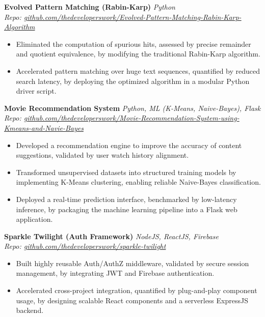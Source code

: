 \documentclass[10pt, letterpaper]{article}
\begin{document}
\noindent \textbf{Evolved Pattern Matching (Rabin-Karp)} \hfill \textit{Python} \\
\textit{Repo: \href{https://github.com/thedeveloperswork/Evolved-Pattern-Matching-Rabin-Karp-Algorithm}{github.com/thedeveloperswork/Evolved-Pattern-Matching-Rabin-Karp-Algorithm}}
\begin{itemize}
    \setlength{\itemsep}{1pt}
    \item Eliminated the computation of spurious hits, assessed by precise remainder and quotient equivalence, by modifying the traditional Rabin-Karp algorithm.
    \item Accelerated pattern matching over huge text sequences, quantified by reduced search latency, by deploying the optimized algorithm in a modular Python driver script.
\end{itemize}

\vspace{2pt}

\noindent \textbf{Movie Recommendation System} \hfill \textit{Python, ML (K-Means, Naive-Bayes), Flask} \\
\textit{Repo: \href{https://github.com/thedeveloperswork/Movie-Recommendation-System-using-Kmeans-and-Navie-Bayes}{github.com/thedeveloperswork/Movie-Recommendation-System-using-Kmeans-and-Navie-Bayes}}
\begin{itemize}
    \setlength{\itemsep}{1pt}
    \item Developed a recommendation engine to improve the accuracy of content suggestions, validated by user watch history alignment.
    \item Transformed unsupervised datasets into structured training models by implementing K-Means clustering, enabling reliable Naive-Bayes classification.
    \item Deployed a real-time prediction interface, benchmarked by low-latency inference, by packaging the machine learning pipeline into a Flask web application.
\end{itemize}

\vspace{2pt}

\noindent \textbf{Sparkle Twilight (Auth Framework)} \hfill \textit{NodeJS, ReactJS, Firebase} \\
\textit{Repo: \href{https://github.com/thedeveloperswork/sparkle-twilight}{github.com/thedeveloperswork/sparkle-twilight}}
\begin{itemize}
    \setlength{\itemsep}{1pt}
    \item Built highly reusable Auth/AuthZ middleware, validated by secure session management, by integrating JWT and Firebase authentication.
    \item Accelerated cross-project integration, quantified by plug-and-play component usage, by designing scalable React components and a serverless ExpressJS backend.
\end{itemize}
\end{document}
